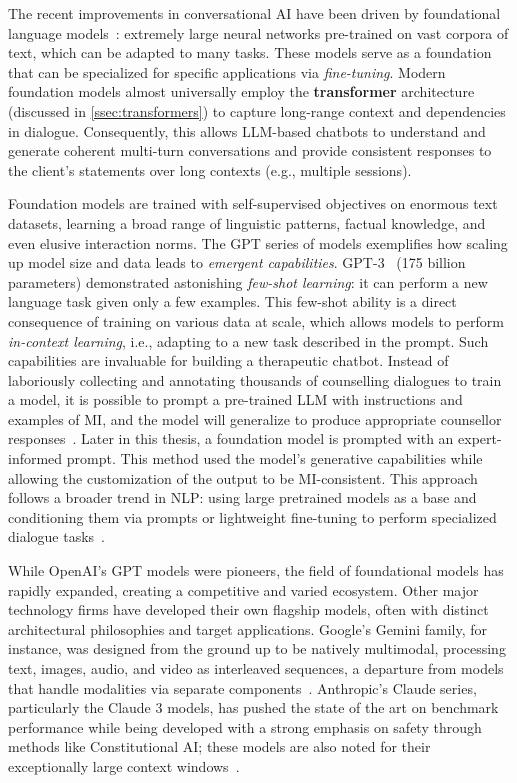 The recent improvements in conversational AI have been driven by foundational language models~\cite{stanfordCRFM2021}: extremely large neural networks pre-trained on vast corpora of text, which can be adapted to many tasks. These models serve as a foundation that can be specialized for specific applications via \emph{fine-tuning}. Modern foundation models almost universally employ the \textbf{transformer} architecture (discussed in \cref{ssec:transformers}) to capture long-range context and dependencies in dialogue. Consequently, this allows LLM-based chatbots to understand and generate coherent multi-turn conversations and provide consistent responses to the client's statements over long contexts (e.g., multiple sessions).

Foundation models are trained with self-supervised objectives on enormous text datasets, learning a broad range of linguistic patterns, factual knowledge, and even elusive interaction norms. The GPT series of models exemplifies how scaling up model size and data leads to \emph{emergent capabilities}. GPT-3~\cite{brown2020language} (175 billion parameters) demonstrated astonishing \emph{few-shot learning}: it can perform a new language task given only a few examples. This few-shot ability is a direct consequence of training on various data at scale, which allows models to perform \emph{in-context learning}, i.e., adapting to a new task described in the prompt. Such capabilities are invaluable for building a therapeutic chatbot. Instead of laboriously collecting and annotating thousands of counselling dialogues to train a model, it is possible to prompt a pre-trained LLM with instructions and examples of MI, and the model will generalize to produce appropriate counsellor responses~\cite{xie-etal-2024-shot-dialogue}. Later in this thesis, a foundation model is prompted with an expert-informed prompt. This method used the model's generative capabilities while allowing the customization of the output to be MI-consistent. This approach follows a broader trend in NLP: using large pretrained models as a base and conditioning them via prompts or lightweight fine-tuning to perform specialized dialogue tasks~\cite{10.5555/3600270.3602070}.

While OpenAI's GPT models were pioneers, the field of foundational models has rapidly expanded, creating a competitive and varied ecosystem. Other major technology firms have developed their own flagship models, often with distinct architectural philosophies and target applications. Google's Gemini family, for instance, was designed from the ground up to be natively multimodal, processing text, images, audio, and video as interleaved sequences, a departure from models that handle modalities via separate components~\cite{team2023gemini}. Anthropic's Claude series, particularly the Claude 3 models, has pushed the state of the art on benchmark performance while being developed with a strong emphasis on safety through methods like Constitutional AI; these models are also noted for their exceptionally large context windows~\cite{anthropic2024claude}.

